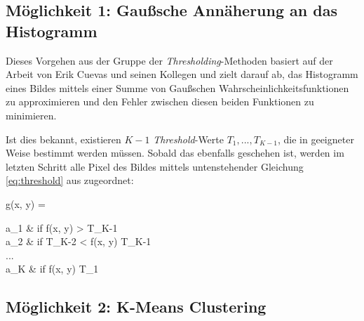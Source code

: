 	\subsection{Möglichkeit 1: Gaußsche Annäherung an das Histogramm}
	\label{sec:meth1}
		
		Dieses Vorgehen aus der Gruppe der \textit{Thresholding}-Methoden basiert auf der Arbeit von Erik Cuevas und seinen Kollegen \cite{cuevas-meth1} und zielt darauf ab, das Histogramm eines Bildes mittels einer Summe von Gaußschen Wahrscheinlichkeitsfunktionen zu approximieren und den Fehler zwischen diesen beiden Funktionen zu minimieren.
		
		Ist dies bekannt, existieren $K-1$ \textit{Threshold}-Werte $T_{1}, ... , T_{K-1}$, die in geeigneter Weise bestimmt werden müssen. Sobald das ebenfalls geschehen ist, werden im letzten Schritt alle Pixel des Bildes mittels untenstehender Gleichung \ref{eq:threshold} aus \cite[S. 739]{gonzalez-woods} zugeordnet:
		
		\begin{flalign}
			\centering
			g(x, y) = 
			\begin{cases}
				a_{1} & \textrm{if } f(x, y) > T_{K-1} \\
				a_{2} & \textrm{if } T_{K-2} < f(x, y) \leq T_{K-1} \\
				... \\
				a_{K} & \textrm{if } f(x, y) \leq T_{1}
			\end{cases}
			\label{eq:threshold}
		\end{flalign}
	
	\subsection{Möglichkeit 2: K-Means Clustering}
	\label{sec:meth2}
